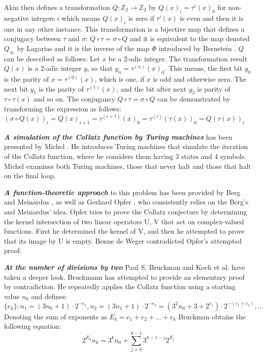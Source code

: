 Akin then defines a transformation $Q:\mathbb{Z}_2\rightarrow\mathbb{Z}_2$ by $Q(x)_i=\tau^i(x)_0$ for non-negative integers $i$ which means $Q(x)_i$ is zero if $\tau^i(x)$ is even and then it is one in any other instance. This transformation is a bijective map that defines a conjugacy between $\tau$ and $\sigma$: $Q\circ\tau=\sigma\circ Q$ and it is equivalent to the map denoted $Q_\infty$ by Lagarias \cite{Ref_Lagarias_1985} and it is the inverse of the map $\Phi$ introduced by Bernstein \cite{Ref_Bernstein_Lagarias_1996}. $Q$ can be described as follows: Let $x$ be a 2-adic integer. The transformation result $Q(x)$ is a 2-adic integer $y$, so that $y_n=\tau^{(n)}(x)_0$. This means, the first bit $y_0$ is the parity of $x=\tau^{(0)}(x)$, which is one, if $x$ is odd and otherwise zero. The next bit $y_1$ is the parity of $\tau^{(1)}(x)$, and the bit after next $y_2$ is parity of $\tau\circ\tau(x)$ and so on. The conjugancy $Q\circ\tau=\sigma\circ Q$ can be demonstrated by transforming the expression as follows: $(\sigma\circ Q(x))_i=Q(x)_{i+1}=\tau^{(i+1)}(x)_0=\tau^{(i)}(\tau(x))_0=Q(\tau(x))_i$

\par\medskip
\textit{\textbf{A simulation of the Collatz function by Turing machines}} has been presented by Michel \cite{Ref_Michel_2014}. He introduces Turing machines that simulate the iteration of the Collatz function, where he considers them having 3 states and 4 symbols. Michel examines both Turing machines, those that never halt and those that halt on the final loop.

\par\medskip
\textit{\textbf{A function-theoretic approach}} to this problem has been provided by Berg and Meinardus \cite{Ref_Berg_Meinardus_1994}, \cite{Ref_Berg_Meinardus_1995} as well as Gerhard Opfer \cite{Ref_Opfer_2011}, who consistently relies on the Berg’s and Meinardus’ idea. Opfer tries to prove the Collatz conjecture by determining the kernel intersection of two linear operators U, V that act on complex-valued functions. First he determined the kernel of V, and then he attempted to prove that its image by U is empty. Benne de Weger \cite{Ref_de_Weger_2011} contradicted Opfer’s attempted proof.

\par\medskip
\textit{\textbf{At the number of divisions by two}} Paul S. Bruckman \cite{Ref_Bruckman_2008} and Koch et al. \cite{Ref_Koch_2020} have taken a deeper look. Bruckmann has attempted to provide an elementary proof by contradiction. He repeatedly applies the Collatz function using a starting value $n_0$ and defines:
\[
\{e_k\}:n_1=(3n_0+1)\cdot2^{-e_1},n_2=(3n_1+1)\cdot2^{-e_2}=(3^2n_0+3+2^{e_1})\cdot2^{-(e_1+e_2)},\ldots
\]
Denoting the sum of exponents as $E_k=e_1+e_2+\ldots+e_k$ Bruckman obtains the following equation:
\[
2^{E_k}n_k=3^kn_0+\sum_{j=0}^{k-1}3^{k-1-j}2^{E_j}
\]

